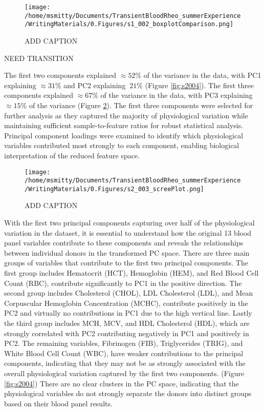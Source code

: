 \documentclass[12pt,letterpaper]{article}
\begin{document}
\begin{figure}[ht]
    \centering
    \texttt{[image: /home/msmitty/Documents/TransientBloodRheo\_summerExperience/WritingMaterials/0.Figures/s1\_002\_boxplotComparison.png]}
    \caption{ADD CAPTION}
    \label{fig:s1002}
\end{figure}

NEED TRANSITION

The first two components explained $\approx 52\%$ of the variance in the data, with PC1 explaining $\approx 31\%$ and PC2 explaining $~21\%$ (Figure \ref{fig:s2004}).
The first three components explained $\approx 67\%$ of the variance in the data, with PC3 explaining $\approx 15\%$ of the variance (Figure \ref{fig:s2003}). The first three components
were selected for further analysis as they captured the majority of physiological variation while maintaining sufficient sample-to-feature ratios for robust statistical analysis.
Principal component loadings were examined to identify which physiological variables contributed most strongly to each component, enabling biological interpretation of the reduced feature space.
\begin{figure}[ht]
    \centering
    \texttt{[image: /home/msmitty/Documents/TransientBloodRheo\_summerExperience/WritingMaterials/0.Figures/s2\_003\_screePlot.png]}
    \caption{ADD CAPTION}
    \label{fig:s2003}
\end{figure}


With the first two principal components capturing over half of the physiological variation in the dataset, it is essential to understand how the original 13 blood panel variables contribute to
these components and reveals the relationships between individual donors in the transformed PC space. There are three main groups of variables that contribute to the first two principal components.
The first group includes Hematocrit (HCT), Hemoglobin (HEM), and Red Blood Cell Count (RBC), contribute significantly to PC1 in the positive direction. The second group includes Cholesterol (CHOL),
LDL Cholesterol (LDL), and Mean Corpuscular Hemoglobin Concentration (MCHC), contribute positively in the PC2 and virtually no contributions in PC1 due to the high vertical line.
Lastly the third group includes MCH, MCV, and HDL Cholesterol (HDL), which are strongly correlated with PC2 contributing negatively in PC1 and positively in PC2. The remaining variables, Fibrinogen (FIB),
Triglycerides (TRIG), and White Blood Cell Count (WBC), have weaker contributions to the principal components, indicating that they may not be as strongly associated with the overall physiological variation
captured by the first two components. (Figure \ref{fig:s2004}) There are no clear clusters in the PC space, indicating that the physiological variables do not strongly separate the donors into distinct groups based
on their blood panel results.
\end{document}
